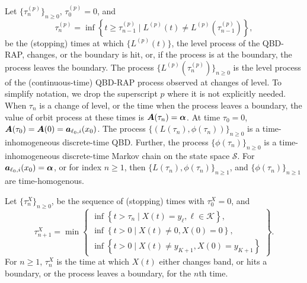 Let \(\{\tau_n^{(p)}\}_{n\geq 0}\), \(\tau_0^{(p)}=0\), and
\[\tau_{n}^{(p)} = \inf\left\{t\geq \tau_{n-1}^{(p)} \mid L^{(p)}(t)\neq L^{(p)}(\tau_{n-1}^{(p)})\right\},\]
be the (stopping) times at which \(\{L^{(p)}(t)\}\), the level process of the QBD-RAP, changes, or the boundary is hit, or, if the process is at the boundary, the process leaves the boundary. The process \(\{L^{(p)}(\tau_n^{(p)})\}_{n\geq 0}\) is the level process of the (continuous-time) QBD-RAP process observed at changes of level. To simplify notation, we drop the superscript \(p\) where it is not explicitly needed. When \(\tau_n\) is a change of level, or the time when the process leaves a boundary, the value of orbit process at these times is \(\boldsymbol A(\tau_n) = \boldsymbol \alpha\). At time \(\tau_0=0\), \(\boldsymbol A(\tau_0)=\boldsymbol A(0) = \boldsymbol   a_{\ell_0,i}(x_0)\). The process \(\{(L(\tau_n),\phi(\tau_n))\}_{n\geq 0}\) is a time-inhomogeneous discrete-time QBD. Further, the process \(\{\phi(\tau_n)\}_{n\geq 0}\) is a time-inhomogeneous discrete-time Markov chain on the state space \(\mathcal S\). For \(\boldsymbol   a_{\ell_0,i}(x_0) = \boldsymbol \alpha\), or for index \(n\geq 1\), then \(\{L(\tau_n),\phi(\tau_n)\}_{n\geq 1}\), and \(\{\phi(\tau_n)\}_{n\geq 1}\) are time-homogenous.

Let \(\{\tau_n^X\}_{n\geq 0}\), be the sequence of (stopping) times with \(\tau_0^X=0\), and 
\[\tau_{n+1}^X = \min\left\{\begin{array}{c}\inf\left\{t>\tau_n\mid X(t)=y_{\ell}, \ell\in\mathcal K\right\}, \\ \inf\left\{t>0 \mid X(t) \neq 0, X(0)=0\right\}, \\ \inf\left\{t>0 \mid X(t) \neq y_{K+1}, X(0)=y_{K+1}\right\} \end{array} \right\}.\]
For \(n\geq 1\), \(\tau_n^X\) is the time at which \(X(t)\) either changes band, or hits a boundary, or the process leaves a boundary, for the \(n\)th time. 

